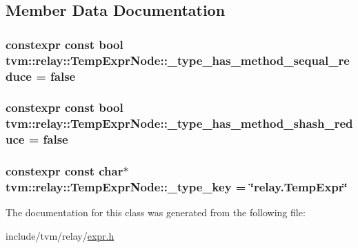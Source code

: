 \subsection{Member Data Documentation}
\subsubsection[{\texorpdfstring{\+\_\+type\+\_\+has\+\_\+method\+\_\+sequal\+\_\+reduce}{_type_has_method_sequal_reduce}}]{\setlength{\rightskip}{0pt plus 5cm}constexpr const bool tvm\+::relay\+::\+Temp\+Expr\+Node\+::\+\_\+type\+\_\+has\+\_\+method\+\_\+sequal\+\_\+reduce = false\hspace{0.3cm}{\ttfamily [static]}}\hypertarget{classtvm_1_1relay_1_1TempExprNode_afb013407e0e5b935bd88bb49c23e2d50}{}\label{classtvm_1_1relay_1_1TempExprNode_afb013407e0e5b935bd88bb49c23e2d50}
\subsubsection[{\texorpdfstring{\+\_\+type\+\_\+has\+\_\+method\+\_\+shash\+\_\+reduce}{_type_has_method_shash_reduce}}]{\setlength{\rightskip}{0pt plus 5cm}constexpr const bool tvm\+::relay\+::\+Temp\+Expr\+Node\+::\+\_\+type\+\_\+has\+\_\+method\+\_\+shash\+\_\+reduce = false\hspace{0.3cm}{\ttfamily [static]}}\hypertarget{classtvm_1_1relay_1_1TempExprNode_ad9c7fcdf8928bc7e3ef8ec1f2faf7472}{}\label{classtvm_1_1relay_1_1TempExprNode_ad9c7fcdf8928bc7e3ef8ec1f2faf7472}
\subsubsection[{\texorpdfstring{\+\_\+type\+\_\+key}{_type_key}}]{\setlength{\rightskip}{0pt plus 5cm}constexpr const char$\ast$ tvm\+::relay\+::\+Temp\+Expr\+Node\+::\+\_\+type\+\_\+key = \char`\"{}relay.\+Temp\+Expr\char`\"{}\hspace{0.3cm}{\ttfamily [static]}}\hypertarget{classtvm_1_1relay_1_1TempExprNode_ac084e1c4d6ded06887fb1a2b8837b22c}{}\label{classtvm_1_1relay_1_1TempExprNode_ac084e1c4d6ded06887fb1a2b8837b22c}


The documentation for this class was generated from the following file\+:\begin{DoxyCompactItemize}
\item 
include/tvm/relay/\hyperlink{relay_2expr_8h}{expr.\+h}\end{DoxyCompactItemize}
